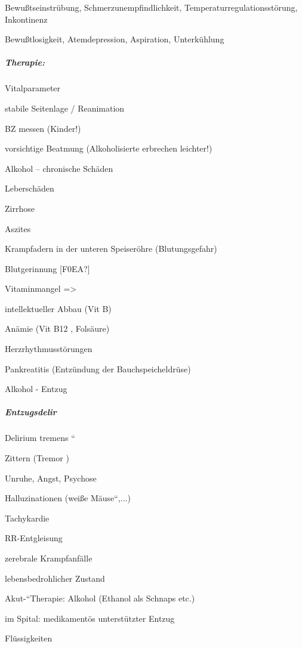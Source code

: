 {\mdseries
Bewu{\ss}tseinstr\"ubung,  Schmerzunempfindlichkeit, 
Temperaturregulationsstörung, Inkontinenz}

{\mdseries
Bewu{\ss}tlosigkeit, Atemdepression, Aspiration,  Unterk\"uhlung}

\subparagraph*{Therapie:}

{\mdseries
Vitalparameter}

{\mdseries
stabile Seitenlage / Reanimation}

{\mdseries
BZ messen (Kinder!)}

{\mdseries
vorsichtige Beatmung (Alkoholisierte erbrechen  leichter!)}

{\mdseries
Alkohol -- chronische Schäden}

{\mdseries
Leberschäden}

{\mdseries
Zirrhose}

{\mdseries
Aszites}

{\mdseries
Krampfadern in der unteren Speiseröhre  (Blutungsgefahr)}

{\mdseries
Blutgerinnung [F0EA?]}

{\mdseries
Vitaminmangel ={\textgreater} }

{\mdseries
intellektueller Abbau (Vit B)}

{\mdseries
Anämie (Vit B12 , Folsäure)}

{\mdseries
Herzrhythmusstörungen}

{\mdseries
Pankreatitis (Entz\"undung der  Bauchspeicheldr\"use)}

{\mdseries
Alkohol - Entzug}

\subparagraph{Entzugsdelir}
{\mdseries
{\quotedblbase}Delirium tremens {\textquotedblleft}}

{\mdseries
Zittern (Tremor )}

{\mdseries
Unruhe, Angst, Psychose}

{\mdseries
Halluzinationen ({\quotedblbase}wei{\ss}e
Mäuse{\textquotedblleft},...)}

{\mdseries
Tachykardie}

{\mdseries
RR-Entgleisung}

{\mdseries
zerebrale Krampfanfälle}

{\mdseries
lebensbedrohlicher Zustand}

{\mdseries
{\quotedblbase}Akut-{\textquotedblleft}Therapie: Alkohol (Ethanol als
Schnaps  etc.)}

{\mdseries
im Spital: medikamentös unterst\"utzter Entzug }

{\mdseries\color[rgb]{0.0,0.0,0.5019608}
Fl\"ussigkeiten}


